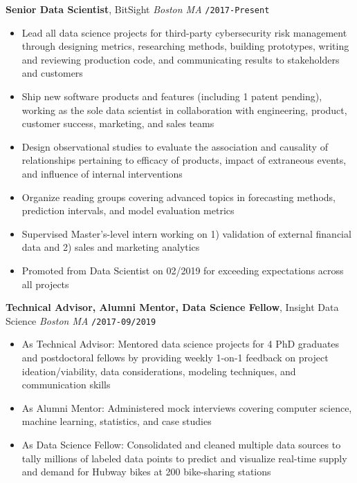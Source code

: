 \documentclass[10pt,english]{report}
\begin{document}
\textbf{Senior Data Scientist}, BitSight \hfill \textit{Boston MA} \texttt{/2017-Present}
\begin{itemize}
    \item Lead all data science projects for third-party cybersecurity risk management through designing metrics, researching methods, building prototypes, writing and reviewing production code, and communicating results to stakeholders and customers
    \item Ship new software products and features (including 1 patent pending), working as the sole data scientist in collaboration with engineering, product, customer success, marketing, and sales teams
    \item Design observational studies to evaluate the association and causality of relationships pertaining to efficacy of products, impact of extraneous events, and influence of internal interventions
    \item Organize reading groups covering advanced topics in forecasting methods, prediction intervals, and model evaluation metrics
    \item Supervised Master's-level intern working on 1) validation of external financial data and 2) sales and marketing analytics
    \item Promoted from Data Scientist on 02/2019 for exceeding expectations across all projects
\end{itemize}

\vspace{1mm}

\textbf{Technical Advisor, Alumni Mentor, Data Science Fellow}, Insight Data Science \hfill \textit{Boston MA} \texttt{/2017-09/2019}
\begin{itemize}
    \item As Technical Advisor: Mentored data science projects for 4 PhD graduates and postdoctoral fellows by providing weekly 1-on-1 feedback on project ideation/viability, data considerations, modeling techniques, and communication skills
    \item As Alumni Mentor: Administered mock interviews covering computer science, machine learning, statistics, and case studies
    \item As Data Science Fellow: Consolidated and cleaned multiple data sources to tally millions of labeled data points to predict and visualize real-time supply and demand for Hubway bikes at 200 bike-sharing stations
\end{itemize}
\end{document}
